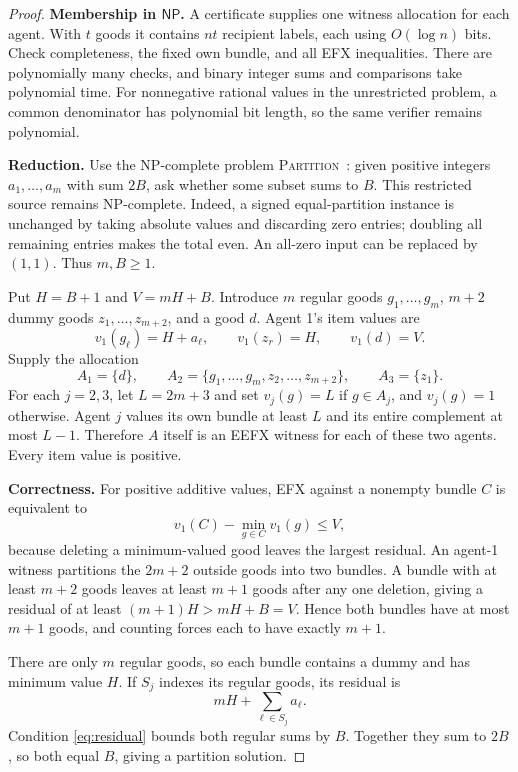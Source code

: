 \documentclass[11pt]{article}
\newcommand{\NP}{\mathsf{NP}}
\begin{document}
\begin{proof}
\textbf{Membership in $\NP$.}
A certificate supplies one witness allocation for each agent.
With $t$ goods it contains $nt$ recipient labels, each using
$O(\log n)$ bits. Check completeness, the fixed own bundle, and all EFX
inequalities. There are polynomially many checks, and binary integer
sums and comparisons take polynomial time. For nonnegative rational
values in the unrestricted problem, a common denominator has polynomial
bit length, so the same verifier remains polynomial.

\textbf{Reduction.}
Use the NP-complete problem \textsc{Partition}~\cite{karp}: given positive
integers $a_1,\ldots,a_m$ with sum $2B$, ask whether some subset sums to
$B$. This restricted source remains NP-complete. Indeed, a signed
equal-partition instance is unchanged by taking absolute values and
discarding zero entries; doubling all remaining entries makes the total
even. An all-zero input can be replaced by $(1,1)$.
Thus $m,B\geq1$.

Put $H=B+1$ and $V=mH+B$. Introduce $m$ regular goods
$g_1,\ldots,g_m$, $m+2$ dummy goods $z_1,\ldots,z_{m+2}$, and a good $d$.
Agent 1's item values are
\[
 v_1(g_\ell)=H+a_\ell,\qquad v_1(z_r)=H,\qquad v_1(d)=V.
\]
Supply the allocation
\[
 A_1=\{d\},\qquad
 A_2=\{g_1,\ldots,g_m,z_2,\ldots,z_{m+2}\},\qquad
 A_3=\{z_1\}.
\]
For each $j=2,3$, let $L=2m+3$ and set $v_j(g)=L$ if $g\in A_j$,
and $v_j(g)=1$ otherwise. Agent $j$ values its own bundle at least $L$
and its entire complement at most $L-1$. Therefore $A$ itself is an
EEFX witness for each of these two agents. Every item value is positive.

\textbf{Correctness.}
For positive additive values, EFX against a nonempty bundle $C$ is
equivalent to
\[
 v_1(C)-\min_{g\in C}v_1(g)\leq V,
 \tag{1}\label{eq:residual}
\]
because deleting a minimum-valued good leaves the largest residual.
An agent-1 witness partitions the $2m+2$ outside goods into two bundles.
A bundle with at least $m+2$ goods leaves at least $m+1$ goods after
any one deletion, giving a residual of at least
$(m+1)H>mH+B=V$. Hence both bundles have at most $m+1$ goods, and
counting forces each to have exactly $m+1$.

There are only $m$ regular goods, so each bundle contains a dummy and
has minimum value $H$. If $S_j$ indexes its regular goods, its residual is
\[
 mH+\sum_{\ell\in S_j}a_\ell.
\]
Condition \eqref{eq:residual} bounds both regular sums by $B$.
Together they sum to $2B$, so both equal $B$, giving a partition solution.


\end{proof}
\end{document}
